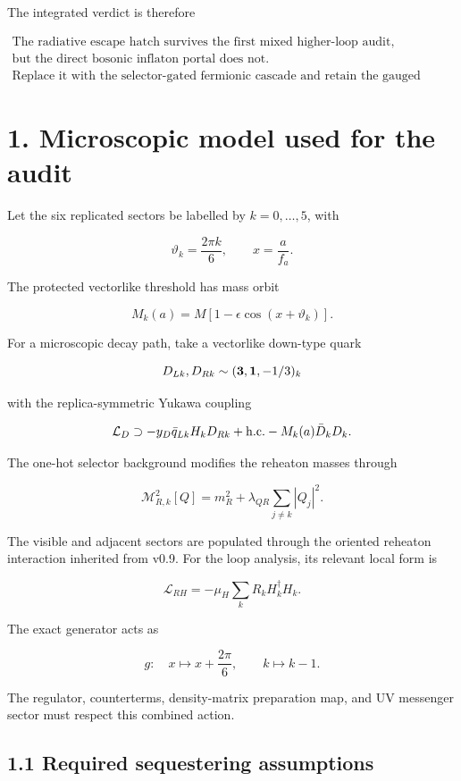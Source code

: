 \documentclass[
  10pt,
]{article}
\begin{document}
The integrated verdict is therefore

\[
\boxed{
\begin{gathered}
\text{The radiative escape hatch survives the first mixed higher-loop audit,}\\
\text{but the direct bosonic inflaton portal does not.}\\
\text{Replace it with the selector-gated fermionic cascade and retain the gauged moose.}
\end{gathered}}
\]

\section{1. Microscopic model used for the
audit}\label{microscopic-model-used-for-the-audit}

Let the six replicated sectors be labelled by \(k=0,\ldots,5\), with

\[
\vartheta_k=\frac{2\pi k}{6},
\qquad
x=\frac a{f_a}.
\]

The protected vectorlike threshold has mass orbit

\[
M_k(a)=M\left[1-\epsilon\cos(x+\vartheta_k)\right].
\]

For a microscopic decay path, take a vectorlike down-type quark

\[
D_{Lk},D_{Rk}\sim({\bf3},{\bf1},-1/3)_k
\]

with the replica-symmetric Yukawa coupling

\[
\mathcal L_D
\supset
-y_D\bar q_{Lk}H_kD_{Rk}+{\rm h.c.}
-M_k(a)\bar D_kD_k.
\]

The one-hot selector background modifies the reheaton masses through

\[
\mathcal M_{R,k}^2[Q]
=
m_R^2+
\lambda_{QR}\sum_{j\ne k}|Q_j|^2.
\]

The visible and adjacent sectors are populated through the oriented
reheaton interaction inherited from v0.9. For the loop analysis, its
relevant local form is

\[
\mathcal L_{RH}
=
-\mu_H\sum_kR_kH_k^\dagger H_k.
\]

The exact generator acts as

\[
g:\quad
x\mapsto x+\frac{2\pi}{6},
\qquad
k\mapsto k-1.
\]

The regulator, counterterms, density-matrix preparation map, and UV
messenger sector must respect this combined action.

\subsection{1.1 Required sequestering
assumptions}\label{required-sequestering-assumptions}
\end{document}
